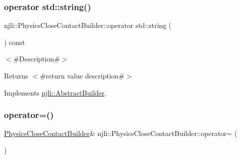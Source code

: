 \subsubsection{\texorpdfstring{operator std\+::string()}{operator std::string()}}
{\footnotesize\ttfamily njli\+::\+Physics\+Close\+Contact\+Builder\+::operator std\+::string (\begin{DoxyParamCaption}{ }\end{DoxyParamCaption}) const\hspace{0.3cm}{\ttfamily [virtual]}}

$<$\#\+Description\#$>$

\begin{DoxyReturn}{Returns}
$<$\#return value description\#$>$ 
\end{DoxyReturn}


Implements \mbox{\hyperlink{classnjli_1_1_abstract_builder_a3e6e553e06d1ca30517ad5fb0bd4d000}{njli\+::\+Abstract\+Builder}}.

\mbox{\label{classnjli_1_1_physics_close_contact_builder_a6608b0fc3b34ad18eb5cc3c50e177e22}} 
\subsubsection{\texorpdfstring{operator=()}{operator=()}}
{\footnotesize\ttfamily \mbox{\hyperlink{classnjli_1_1_physics_close_contact_builder}{Physics\+Close\+Contact\+Builder}}\& njli\+::\+Physics\+Close\+Contact\+Builder\+::operator= (\begin{DoxyParamCaption}\item[{const \mbox{\hyperlink{classnjli_1_1_physics_close_contact_builder}{Physics\+Close\+Contact\+Builder}} \&}]{ }\end{DoxyParamCaption})\hspace{0.3cm}{\ttfamily [protected]}}

\mbox{\label{classnjli_1_1_physics_close_contact_builder_ad71770ba21104190fba89c76468e77a3}} 
